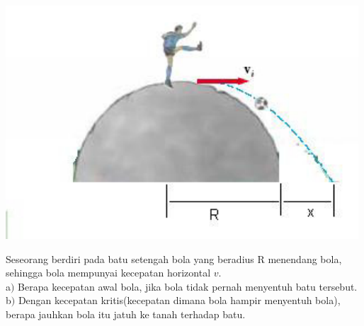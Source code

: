 \item
\mbox{}
\begin{center}
\includegraphics [scale=0.7]{latex/eps/1_4_2_image_1-eps-converted-to.pdf}
\end{center}
Seseorang berdiri pada batu setengah bola yang beradius R menendang bola, sehingga bola mempunyai kecepatan horizontal $v$. \\ a$)$ Berapa kecepatan awal bola, jika bola tidak pernah menyentuh batu tersebut. \\
b$)$ Dengan kecepatan kritis(kecepatan dimana bola hampir menyentuh bola), berapa jauhkan bola itu jatuh ke tanah terhadap batu.

